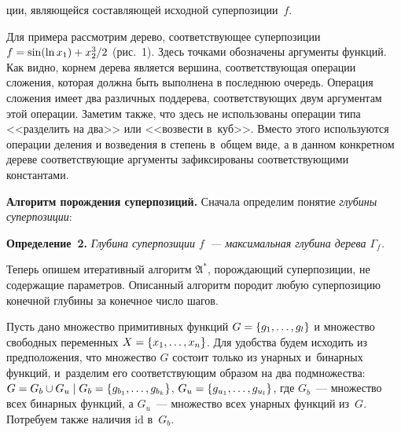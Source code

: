 \begin{multicols}{2}

\vspace*{12pt}

\addtocounter{figure}{1}

\noindent
ции, являющейся составляющей исходной суперпозиции~$f$.

Для примера рассмотрим дерево, со\-от\-вет\-ст\-ву\-ющее суперпозиции $f \hm= \sin (\ln x_1) + 
{x_2^3}/{2}$ (рис.~1).
Здесь точками обозначены аргументы функций. Как видно, корнем дерева является
вершина, соответствующая операции сложения, которая должна быть выполнена
в последнюю очередь. Операция сложения имеет два различных поддерева,
соответствующих двум аргументам этой операции. Заметим также, что здесь не
использованы операции типа <<разделить на два>> или <<возвести в~куб>>.
Вместо этого используются операции деления и возведения в степень в~общем
виде, а в данном конкретном дереве соответствующие аргументы зафиксированы
соответствующими константами.

\smallskip


\noindent
\textbf{Алгоритм порождения суперпозиций.} Сначала определим понятие
\textit{глубины суперпозиции}:

\smallskip

\noindent
\textbf{Определение~2.}
\textit{Глубина суперпозиции $f$~--- максимальная глубина дерева $\Gamma_f$.}

\smallskip

Теперь опишем итеративный алгоритм $\mathfrak{A^*}$, порождающий суперпозиции,
не содержащие параметров. Описанный алгоритм породит любую суперпозицию
конечной глубины за конечное число шагов.

Пусть дано множество примитивных функций $G \hm= \{ g_1, \dots, g_l \}$ и
множество свободных переменных $X \hm= \{ x_1, \dots, x_n \}$. Для удобства будем
исходить из предположения, что множество $G$ состоит только из унарных
и~бинарных функций, и~разделим его соответствующим образом на два подмножества:
$G \hm= G_b \cup G_u \mid G_b \hm= \{ g_{b_1}, \dots, g_{b_k} \}$, 
$G_u \hm= \{ g_{u_1}, \dots, g_{u_l} \}$,
где $G_b$~--- множество всех бинарных функций, а $G_u$~--- множество всех
унарных функций из~$G$. Потребуем также наличия $\text{id}$ в~$G_b$.

\smallskip


\end{multicols}
